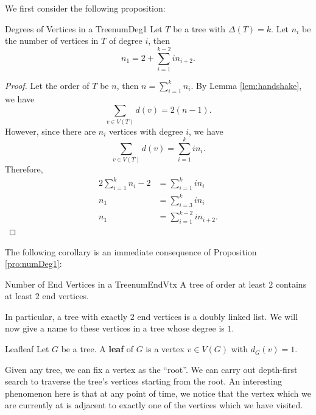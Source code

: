 \documentclass[math, code]{amznotes}
\theoremstyle{remark}
\begin{document}
We first consider the following proposition:
\begin{probox}{Degrees of Vertices in a Tree}{numDeg1}
    Let $T$ be a tree with $\Delta(T) = k$. Let $n_i$ be the number of vertices in $T$ of degree $i$, then
    \begin{equation*}
        n_1 = 2 + \sum_{i = 1}^{k - 2}in_{i + 2}.
    \end{equation*}
    \tcblower
    \begin{proof}
        Let the order of $T$ be $n$, then $n = \sum_{i = 1}^{k}n_i$. By Lemma \ref{lem:handshake}, we have
        \begin{equation*}
            \sum_{v \in V(T)}d(v) = 2(n - 1).
        \end{equation*}
        However, since there are $n_i$ vertices with degree $i$, we have
        \begin{equation*}
            \sum_{v \in V(T)}d(v) = \sum_{i = 1}^{k}in_i.
        \end{equation*}
        Therefore,
        \begin{align*}
            2\sum_{i = 1}^{k}n_i - 2 & = \sum_{i = 1}^{k}in_i \\
            n_1 & = \sum_{i = 3}^{k}in_i \\
            n_1 & = \sum_{i = 1}^{k - 2}in_{i + 2}.
        \end{align*}
    \end{proof}
\end{probox}
The following corollary is an immediate consequence of Proposition \ref{pro:numDeg1}:
\begin{corbox}{Number of End Vertices in a Tree}{numEndVtx}
    A tree of order at least $2$ contains at least $2$ end vertices.
\end{corbox}
In particular, a tree with exactly $2$ end vertices is a doubly linked list. We will now give a name to these vertices in a tree whose degree is $1$.
\begin{dfnbox}{Leaf}{leaf}
    Let $G$ be a tree. A {\color{red} \textbf{leaf}} of $G$ is a vertex $v \in V(G)$ with $d_G(v) = 1$.
\end{dfnbox}
Given any tree, we can fix a vertex as the ``root''. We can carry out depth-first search to traverse the tree's vertices starting from the root. An interesting phenomenon here is that at any point of time, we notice that the vertex which we are currently at is adjacent to exactly one of the vertices which we have visited.
\end{document}
